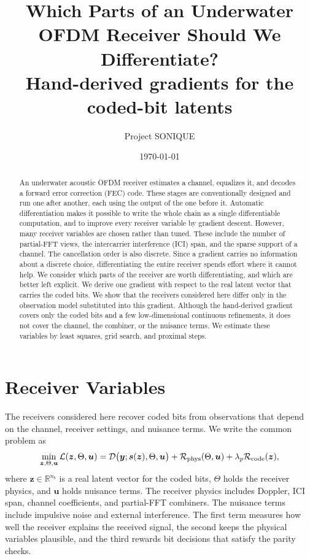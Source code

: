 \documentclass[11pt]{article}
\title{Which Parts of an Underwater OFDM Receiver Should We Differentiate?\\
\large Hand-derived gradients for the coded-bit latents}
\author{Project SONIQUE}
\date{\today}
\newcommand{\R}{\mathbb R}
\begin{document}
\maketitle

\begin{abstract}
An underwater acoustic OFDM receiver estimates a channel, equalizes it, and
decodes a forward error correction (FEC) code.  These stages are conventionally
designed and run one after another, each using the output of the one before it.
Automatic differentiation makes it possible to write the whole chain as a single
differentiable computation, and to improve every receiver variable by gradient
descent.  However, many receiver variables are chosen rather than tuned.  These
include the number of partial-FFT views, the intercarrier interference (ICI)
span, and the sparse support of a channel.  The cancellation order is also
discrete.  Since a gradient carries no information about a discrete
choice, differentiating the entire receiver spends effort where it cannot help.
We consider which parts of the receiver are worth differentiating, and which are
better left explicit.  We derive one gradient with respect to the real latent
vector that carries the coded bits.  We show that the receivers considered here
differ only in the observation model substituted into this gradient.  Although
the hand-derived gradient covers only the coded bits and a few low-dimensional
continuous refinements, it does not cover the channel, the combiner, or the
nuisance terms.  We estimate these variables by least squares, grid search, and
proximal steps.
\end{abstract}

\section{Receiver Variables}

The receivers considered here recover coded bits from observations that depend
on the channel, receiver settings, and nuisance terms.  We write the common
problem as
\begin{equation}
  \min_{\bm z,\Theta,\bm u}
  \mathcal L(\bm z,\Theta,\bm u)
  =
  \mathcal D\big(\bm y;\bm s(\bm z),\Theta,\bm u\big)
  +\mathcal R_{\rm phys}(\Theta,\bm u)
  +\lambda_p \mathcal R_{\rm code}(\bm z),
  \label{eq:master}
\end{equation}
where $\bm z\in\R^{n_b}$ is a real latent vector for the coded bits, $\Theta$
holds the receiver physics, and $\bm u$ holds nuisance terms.  The receiver
physics includes Doppler, ICI span, channel coefficients, and partial-FFT
combiners.  The nuisance terms include impulsive noise and external interference.
The first term measures how well the receiver
explains the received signal, the second keeps the physical variables plausible,
and the third rewards bit decisions that satisfy the parity checks.
\end{document}
